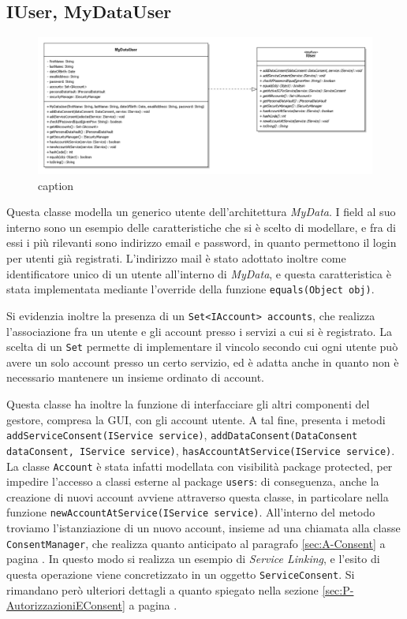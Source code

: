 \subsection{IUser, MyDataUser}
\begin{figure} [h]
	\includegraphics[width=\linewidth]{pictures/Accounting-MyDataUsr.png}
	\caption{caption}
	\label{fig:Accounting-MyDatUsr}
\end{figure}
Questa classe modella un generico utente dell’architettura \textit{MyData}. I field al suo interno sono un esempio delle caratteristiche che si \`e scelto di modellare, e fra di essi i pi\`u rilevanti sono indirizzo email e password, in quanto permettono il login per utenti gi\`a registrati. L’indirizzo mail \`e stato adottato inoltre come identificatore unico di un utente all’interno di \textit{MyData}, e questa caratteristica \`e stata implementata mediante l’override della funzione \texttt{equals(Object obj)}.

Si evidenzia inoltre la presenza di un \texttt{Set<IAccount> accounts}, che realizza l’associazione fra un utente e gli account presso i servizi a cui si \`e registrato. La scelta di un \texttt{Set} permette di implementare il vincolo secondo cui ogni utente pu\`o avere un solo account presso un certo servizio, ed \`e adatta anche in quanto non \`e necessario mantenere un insieme ordinato di account.

Questa classe ha inoltre la funzione di interfacciare gli altri componenti del gestore, compresa la GUI, con gli account utente. A tal fine, presenta i metodi \texttt{addServiceConsent(IService service)}, \texttt{addDataConsent(DataConsent  dataConsent, IService service)}, \texttt{hasAccountAtService(IService service)}.  La classe \texttt{Account} \`e stata infatti modellata con visibilit\`a package protected, per impedire l’accesso a classi esterne al package \texttt{users}: di conseguenza, anche la creazione di nuovi account avviene attraverso questa classe, in particolare nella funzione \texttt{newAccountAtService(IService service)}. All’interno del metodo troviamo l’istanziazione di un nuovo account, insieme ad una chiamata alla classe \texttt{ConsentManager}, che realizza quanto anticipato al paragrafo \ref{sec:A-Consent} a pagina \pageref{sec:A-Consent}. In questo modo si realizza un esempio di \textit{Service Linking}, e l’esito di questa operazione viene concretizzato in un oggetto \texttt{ServiceConsent}. Si rimandano per\`o ulteriori dettagli a quanto spiegato nella sezione \ref{sec:P-AutorizzazioniEConsent} a pagina \pageref{sec:P-AutorizzazioniEConsent}.

